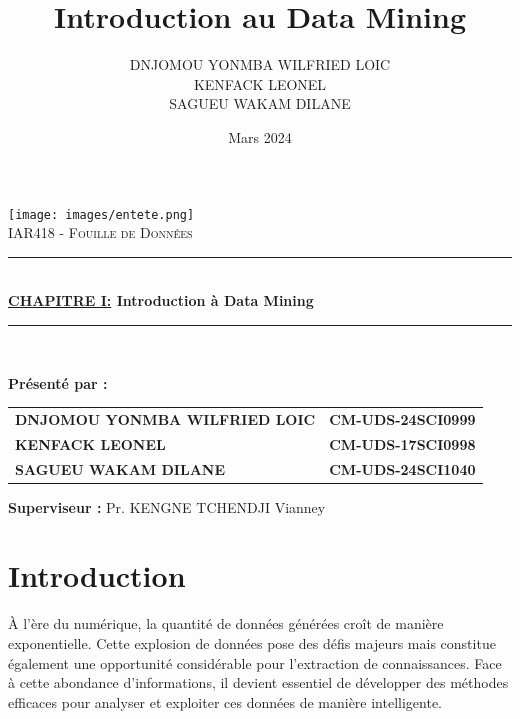 \documentclass[a4paper,14pt]{article}
\title{ Introduction au Data Mining}
\author{DNJOMOU YONMBA WILFRIED LOIC  \\
KENFACK LEONEL \\
SAGUEU WAKAM DILANE \\}
\date{Mars 2024}
\newcommand{\HRule}{\rule{\linewidth}{0.5mm}}
\begin{document}
\begin{titlepage}
    \centering
    \texttt{[image: images/entete.png]}\\[2.0cm]  

    \textsc{\Large IAR418 - Fouille de Données}\\[0.5cm]

    \HRule \\[0.4cm]
    \color{Titleblue}
    \fontsize{20}{23.4}\selectfont
    \huge \bfseries \underline{CHAPITRE I:} Introduction à Data Mining \\[0.4cm]
    \color{black}

    \HRule \\[0.4cm]


    \vspace{2cm}

    \fontsize{15}{18}\selectfont
    \color{black}
    \textbf{Présenté par :}\\[0.5cm]
    
    \begin{tabular}{l l}
        \textbf{DNJOMOU YONMBA WILFRIED LOIC} & \textbf{CM-UDS-24SCI0999} \\
        \textbf{KENFACK LEONEL} & \textbf{CM-UDS-17SCI0998} \\
        \textbf{SAGUEU WAKAM DILANE} & \textbf{CM-UDS-24SCI1040} \\
    \end{tabular}

    \vspace{1cm}

    \fontsize{15}{18}\selectfont
    \color{black}
    \textbf{Superviseur :} Pr. KENGNE TCHENDJI Vianney\\[0.5cm]

    \vfill
    
    \hrulefill

    \vspace{5mm}
    
\end{titlepage}

\renewcommand{\contentsname}{Table des matières}

\tableofcontents
\thispagestyle{empty}
\newpage
\listoffigures
\newpage

\renewcommand{\chaptername}{Chapitre}

    \section*{Introduction}
	À l’ère du numérique, la quantité de données générées croît de manière exponentielle. Cette explosion de données pose des défis majeurs mais constitue également une opportunité considérable pour l’extraction de connaissances. Face à cette abondance d’informations, il devient essentiel de développer des méthodes efficaces pour analyser et exploiter ces données de manière intelligente.
\end{document}
